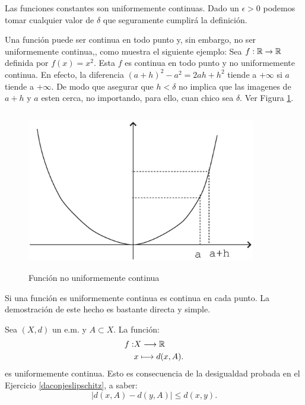 \begin{ejemplo} Las funciones constantes son uniformemente
continuas. Dado un $\epsilon>0$ podemos tomar cualquier valor de
$\delta$ que seguramente cumplir\'a la definici\'on.
\end{ejemplo}
\begin{ejemplo} Una funci\'on puede ser continua en todo punto y,
sin embargo, no ser uniformemente continua,, como muestra el
siguiente ejemplo: Sea $f:\rr\rightarrow\rr$ definida por
$f(x)=x^2$. Esta $f$ es continua en todo punto y no uniformemente
continua. En efecto, la diferencia $(a+h)^2-a^2=2ah+h^2$ tiende a
$+\infty$ si $a$ tiende a $+\infty$. De modo que asegurar que
$h<\delta$ no implica que las imagenes de $a+h$ y $a$ esten cerca,
no importando, para ello, cuan chico sea $\delta$. Ver Figura
\ref{fig,nouncon}.
\end{ejemplo}
\begin{figure}
\begin{center}
    \includegraphics[height=7cm, width=10cm]{nounco.eps}
    \caption{Funci\'on no uniformemente
    continua}\label{fig,nouncon}
\end{center}
\end{figure}

Si una funci\'on es uniformemente continua es continua en cada
punto. La demostraci\'on de este hecho es bastante directa y
simple.
\begin{ejemplo} Sea $(X,d)$ un e.m. y $A\subset X$. La funci\'on:
\[
    \begin{split}
        f:&X\longrightarrow \rr\\
        &x\longmapsto d(x,A).
    \end{split}
\]
es uniformemente continua. Esto es consecuencia de la desigualdad
probada en el Ejercicio \vref{daconjeslipschitz}, a saber:
\[
    |d(x,A)-d(y,A)|\leq d(x,y).
\]
\end{ejemplo}

